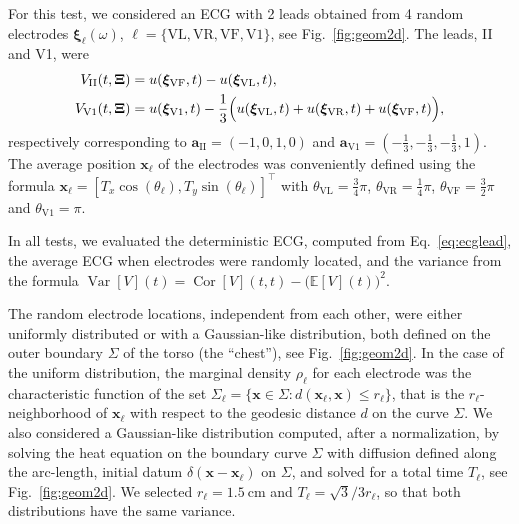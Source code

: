 \documentclass[runningheads]{llncs}
\newcommand{\bs}[1]{\boldsymbol{#1}}
\newcommand{\vx}{\mathbf{x}}
\newcommand{\EE}{\mathbb{E}}
\DeclareMathOperator{\Cor}{Cor}
\DeclareMathOperator{\Var}{Var}
\begin{document}
For this test, we considered an ECG with 2 leads obtained from 4 random electrodes
$\bs\xi_\ell(\omega)$,
$\ell = \{ \mathrm{VL},\mathrm{VR},\mathrm{VF},\mathrm{V1} \}$,
see Fig.~\ref{fig:geom2d}. The leads, II and V1, were
\begin{align*}
V_\mathrm{II}(t,\bs\Xi)  &= u(\bs\xi_\mathrm{VF},t) - u(\bs\xi_\mathrm{VL},t), \\
V_\mathrm{V1}(t,\bs\Xi) &= u(\bs\xi_\mathrm{V1},t)
- \frac{1}{3}\Bigl( u(\bs\xi_\mathrm{VL},t) + u(\bs\xi_\mathrm{VR},t) + u(\bs\xi_\mathrm{VF},t) \Bigr),
\end{align*}
respectively corresponding to $\mathbf{a}_\mathrm{II} = (-1,0,1,0)$ and
$\mathbf{a}_\mathrm{V1} = (-\frac{1}{3},-\frac{1}{3},-\frac{1}{3},1)$.
The average position $\vx_\ell$ of the electrodes
was conveniently defined using the formula $\vx_\ell = [T_x \cos(\theta_\ell), T_y\sin(\theta_\ell)]^\top$
with $\theta_\mathrm{VL} = \frac{3}{4}\pi$, $\theta_\mathrm{VR} = \frac{1}{4}\pi$,
$\theta_\mathrm{VF} = \frac{3}{2}\pi$ and $\theta_\mathrm{V1} = \pi$.

In all tests, we evaluated the deterministic ECG,
computed from Eq.~\eqref{eq:ecglead}, the average ECG when electrodes were randomly
located, and the variance from the formula
$\Var[V](t) = \Cor[V](t,t) - \big(\EE[V](t)\big)^2$.

The random electrode locations, independent from each other,
were either uniformly distributed or
with a Gaussian-like distribution, both defined on the outer boundary $\Sigma$ of
the torso (the ``chest''), see Fig.~\ref{fig:geom2d}.  In the case of the
uniform distribution, the marginal density $\rho_\ell$ for each electrode was the characteristic function of the set $\Sigma_\ell = \{ \vx\in\Sigma: d(\vx_\ell,\vx) \le r_\ell \}$,
that is the $r_\ell$-neighborhood of $\vx_\ell$ with respect to the geodesic distance $d$ on the curve $\Sigma$.
We also considered a Gaussian-like distribution computed, after a normalization,
by solving the heat
equation on the boundary curve $\Sigma$ with diffusion defined along the
arc-length, initial datum $\delta(\vx-\vx_\ell)$ on $\Sigma$,
and solved for a total time $T_\ell$, see Fig.~\ref{fig:geom2d}.
We selected $r_\ell = \SI{1.5}{\cm}$ and $T_\ell = \sqrt{3}/3 r_\ell$,
so that both distributions have the same variance.
\end{document}
